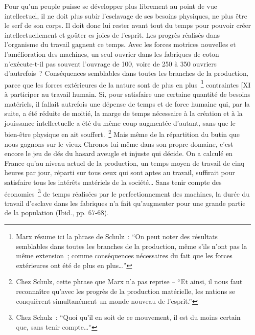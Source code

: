 \documentclass[french,twoside]{book} %
\newenvironment{quoteblock}%
  {\begin{quoting}}
  {\end{quoting}}
\newenvironment{quotebar}{%
    \def\FrameCommand{{\color{rubric!10!}\vrule width 0.5em} \hspace{0.9em}}%
    \def\OuterFrameSep{\itemsep} %
    \MakeFramed {\advance\hsize-\width \FrameRestore}
  }%
  {%
    \endMakeFramed
  }
\renewenvironment{quoteblock}%
  {%
    \savenotes
    \setstretch{0.9}
    \normalfont
    \begin{quotebar}
  }
  {%
    \end{quotebar}
    \spewnotes
  }
\begin{document}
\begin{quoteblock}
 \noindent Pour qu’un peuple puisse se développer plus librement au point de vue intellectuel, il ne doit plus subir l’esclavage de ses besoins physiques, ne plus être le serf de son corps. Il doit donc lui rester avant tout du temps pour pouvoir créer intellectuellement et goûter es joies de l’esprit. Les progrès réalisés dans l’organisme du travail gagnent ce temps. Avec les forces motrices nouvelles et l’amélioration des machines, un seul ouvrier dans les fabriques de coton n’exécute-t-il pas souvent l’ouvrage de 100, voire de 250 à 350 ouvriers d’autrefois ? Conséquences semblables dans toutes les branches de la production, parce que les forces extérieures de la nature sont de plus en plus \footnote{Marx résume ici la phrase de Schulz : “On peut noter des résultats semblables dans toutes les branches de la production, même s’ils n’ont pas la même extension ; comme conséquences nécessaires du fait que les forces extérieures ont été de plus en plus…”} contraintes [XI à participer au travail humain. Si, pour satisfaire une certaine quantité de besoins matériels, il fallait autrefois une dépense de temps et de force humaine qui, par la suite, a été réduite de moitié, la marge de temps nécessaire à la création et à la jouissance intellectuelle a été du même coup augmentée d’autant, sans que le bien-être physique en ait souffert. \footnote{Chez Schulz, cette phrase que Marx n’a pas reprise – “Et ainsi, il nous faut reconnaître qu’avec les progrès de la production matérielle, les nations se conquièrent simultanément un monde nouveau de l’esprit.”} Mais même de la répartition du butin que nous gagnons sur le vieux Chronos lui-même dans son propre domaine, c’est encore le jeu de dés du hasard aveugle et injuste qui décide. On a calculé en France qu’au niveau actuel de la production, un temps moyen de travail de cinq heures par jour, réparti sur tous ceux qui sont aptes au travail, suffirait pour satisfaire tous les intérêts matériels de la société… Sans tenir compte des économies \footnote{Chez Schulz : “Quoi qu’il en soit de ce mouvement, il est du moins certain que, sans tenir compte…”} de temps réalisées par le perfectionnement des machines, la durée du travail d’esclave dans les fabriques n’a fait qu’augmenter pour une grande partie de la population (Ibid., pp. 67-68).\par

\end{quoteblock}
\end{document}
